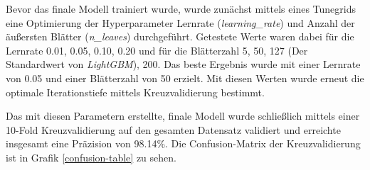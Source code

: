 Bevor das finale Modell trainiert wurde, wurde zunächst mittels eines Tunegrids eine Optimierung der Hyperparameter Lernrate (\textit{learning\_rate}) und Anzahl der äußersten Blätter (\textit{n\_leaves}) durchgeführt.
Getestete Werte waren dabei für die Lernrate 0.01, 0.05, 0.10, 0.20 und für die Blätterzahl 5, 50, 127 (Der Standardwert von \textit{LightGBM}), 200.
Das beste Ergebnis wurde mit einer Lernrate von 0.05 und einer Blätterzahl von 50 erzielt.
Mit diesen Werten wurde erneut die optimale Iterationstiefe mittels Kreuzvalidierung bestimmt.

Das mit diesen Parametern erstellte, finale Modell wurde schließlich mittels einer 10-Fold Kreuzvalidierung auf den gesamten Datensatz validiert und erreichte insgesamt eine Präzision von 98.14\%.
Die Confusion-Matrix der Kreuzvalidierung ist in Grafik \ref{confusion-table} zu sehen.

